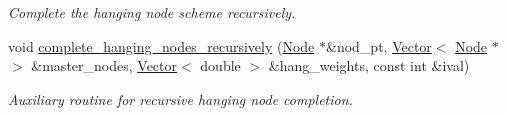 \begin{DoxyCompactItemize}
\begin{DoxyCompactList}\small\item\em Complete the hanging node scheme recursively. \end{DoxyCompactList}\item 
void \hyperlink{classoomph_1_1TreeBasedRefineableMeshBase_a0fe9eaf7cd5b0a664e76643f8fea5504}{complete\+\_\+hanging\+\_\+nodes\+\_\+recursively} (\hyperlink{classoomph_1_1Node}{Node} $\ast$\&nod\+\_\+pt, \hyperlink{classoomph_1_1Vector}{Vector}$<$ \hyperlink{classoomph_1_1Node}{Node} $\ast$$>$ \&master\+\_\+nodes, \hyperlink{classoomph_1_1Vector}{Vector}$<$ double $>$ \&hang\+\_\+weights, const int \&ival)
\begin{DoxyCompactList}\small\item\em Auxiliary routine for recursive hanging node completion. \end{DoxyCompactList}\end{DoxyCompactItemize}
